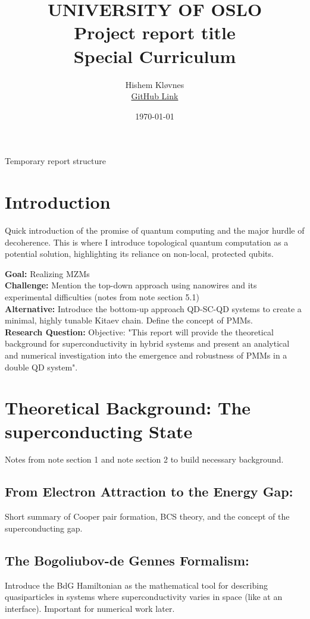 \documentclass[11pt, letterpaper, titlepage]{article}
\title{
 \textbf{\LARGE UNIVERSITY OF OSLO} \\
\vspace{37mm}
\textbf{\Large Project report title}\\
\vspace{7mm}
\Large Special Curriculum \\
\vspace{25mm}
}
\author{\Large Hishem Kløvnes \\ \textcolor{blue}{\href{https://github.com/hishemok/Special_curriculum}{GitHub Link} }}
\date{\Large \today} %
\begin{document}
\maketitle
\newpage



\Large Temporary report structure
\section{Introduction}
Quick introduction of the promise of quantum computing and the major hurdle of decoherence. This is where I introduce topological quantum computation as a potential solution, highlighting its reliance on non-local, protected qubits. 
\par
\textbf{Goal:} Realizing MZMs\\
\textbf{Challenge:} Mention the top-down approach using nanowires and its experimental difficulties (notes from note section 5.1)\\
\textbf{Alternative:} Introduce the bottom-up approach QD-SC-QD systems to create a minimal, highly tunable Kitaev chain. Define the concept of PMMs. \\
\textbf{Research Question:} Objective: "This report will provide the theoretical background for superconductivity in hybrid systems and present an analytical and numerical investigation into the emergence and robustness of PMMs in a double QD system". \\

\section{Theoretical Background: The superconducting State}
Notes from note section 1 and note section 2 to build necessary background.\par
\subsection{From Electron Attraction to the Energy Gap:} Short summary of Cooper pair formation, BCS theory, and the concept of the superconducting gap.\par
\subsection{The Bogoliubov-de Gennes Formalism:} Introduce the BdG Hamiltonian as the  mathematical tool for describing quasiparticles in systems where superconductivity varies in space (like at an interface). Important for numerical work later.\par
\end{document}
